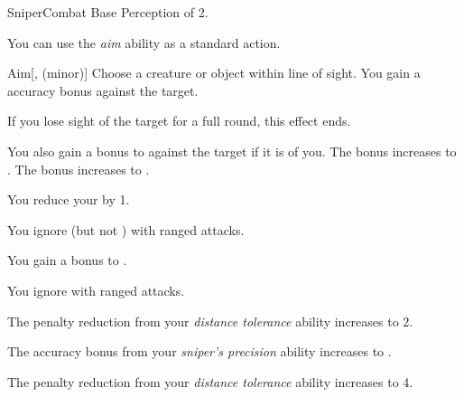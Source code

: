     \begin{feat}{Sniper}{Combat}
        \featpre Base Perception of 2.

         You can use the \textit{aim} ability as a standard action.
        \begin{freeability}{Aim}[,  (minor)]
            Choose a creature or object within line of sight.
            You gain a  accuracy bonus against the target.

            If you lose sight of the target for a full round, this effect ends.

            \rankline
             You also gain a  bonus to  against the target if it is \unaware of you.
             The  bonus increases to .
             The  bonus increases to .
        \end{freeability}

         You reduce your  by 1.

         You ignore  (but not ) with ranged attacks.

         You gain a  bonus to .

         You ignore  with ranged attacks.

         The penalty reduction from your \textit{distance tolerance} ability increases to 2.

         The accuracy bonus from your \textit{sniper's precision} ability increases to .

         The penalty reduction from your \textit{distance tolerance} ability increases to 4.
    \end{feat}

